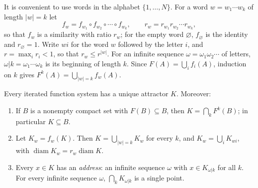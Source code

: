 It is convenient to use words in the alphabet $\{1, \ldots, N\}$. For a word $w = w_1 \cdots w_k$ of length $|w| = k$ let
\[
f_w = f_{w_1} \circ f_{w_2} \circ \cdots \circ f_{w_k}, \qquad r_w = r_{w_1}r_{w_2} \cdots r_{w_k},
\]
so that $f_w$ is a similarity with ratio $r_w$; for the empty word $\varnothing$, $f_\varnothing$ is the identity and $r_\varnothing = 1$. Write $wi$ for the word $w$ followed by the letter $i$, and
$r = \max_ir_i < 1$, so that $r_w \leq r^{|w|}$. For an infinite sequence $\omega = \omega_1\omega_2\cdots$ of letters, $\omega|k = \omega_1 \cdots \omega_k$ is its beginning of length $k$. Since
$F(A) = \bigcup_if_i(A)$, induction on $k$ gives $F^k(A) = \bigcup_{|w| = k}f_w(A)$.

\begin{theorem}[Hutchinson]\label{measure-theory:theorem-hutchinson}
Every iterated function system has a unique attractor $K$. Moreover:
\begin{enumerate}
\item If $B$ is a nonempty compact set with $F(B) \subseteq B$, then $K = \bigcap_kF^k(B)$; in particular $K \subseteq B$.
\item Let $K_w = f_w(K)$. Then $K = \bigcup_{|w| = k}K_w$ for every $k$, and $K_w = \bigcup_iK_{wi}$, with $\operatorname{diam}K_w = r_w\operatorname{diam}K$.
\item Every $x \in K$ has an \emph{address}: an infinite sequence $\omega$ with $x \in K_{\omega|k}$ for all $k$. For every infinite sequence $\omega$, $\bigcap_kK_{\omega|k}$ is a single point.
\end{enumerate}
\end{theorem}

